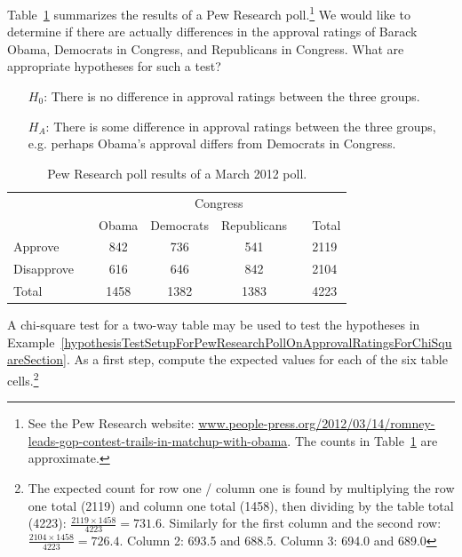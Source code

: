 \begin{example}{Table~\ref{pewResearchPollOnApprovalRatingsForChiSquareSectionExampleAndExercises} summarizes the results of a Pew Research poll.\footnote{See the Pew Research website: {\scriptsize\href{http://www.people-press.org/2012/03/14/romney-leads-gop-contest-trails-in-matchup-with-obama/}{www.people-press.org/2012/03/14/romney-leads-gop-contest-trails-in-matchup-with-obama}}. The counts in Table~\ref{pewResearchPollOnApprovalRatingsForChiSquareSectionExampleAndExercises} are approximate.} We would like to determine if there are actually differences in the approval ratings of Barack Obama, Democrats in Congress, and Republicans in Congress. What are appropriate hypotheses for such a test?}\label{hypothesisTestSetupForPewResearchPollOnApprovalRatingsForChiSquareSection}
\begin{itemize}
\item[$H_0$:] There is no difference in approval ratings between the three groups.
\item[$H_A$:] There is some difference in approval ratings between the three groups, e.g. perhaps Obama's approval differs from Democrats in Congress.
\end{itemize}
\end{example}

\begin{table}
\centering
\begin{tabular}{ll ccc ll}
& & & \multicolumn{2}{c}{Congress} & \\
\cline{4-5}
 & \hspace{1mm} & Obama & Democrats & Republicans & \hspace{1mm} & Total \\
\hline
Approve				   & & 842    & 736 & 541   & 				& 2119 \\
Disapprove			   & & 616    & 646 & 842   &				& 2104 \\
\hline
Total					   & & 1458    & 1382 & 1383 & 				& 4223 \\
\hline
\end{tabular}
\caption{Pew Research poll results of a March 2012 poll.}
\label{pewResearchPollOnApprovalRatingsForChiSquareSectionExampleAndExercises}
\end{table}

\begin{exercise}
A chi-square test for a two-way table may be used to test the hypotheses in Example~\ref{hypothesisTestSetupForPewResearchPollOnApprovalRatingsForChiSquareSection}. As a first step, compute the expected values for each of the six table cells.\footnote{The expected count for row one / column one is found by multiplying the row one total (2119) and column one total (1458), then dividing by the table total (4223): $\frac{2119\times 1458}{4223} = 731.6$. Similarly for the first column and the second row: $\frac{2104\times 1458}{4223} = 726.4$. Column 2: 693.5 and 688.5. Column 3: 694.0 and 689.0}
\end{exercise}

